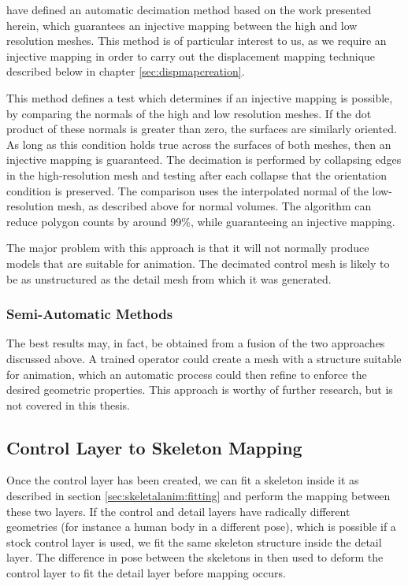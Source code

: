 \citet{Collins02} have defined an automatic decimation method based on the work presented herein, which guarantees an injective mapping between the high and low resolution meshes. This method is of particular interest to us, as we require an injective mapping in order to carry out the displacement mapping technique described below in chapter \ref{sec:dispmapcreation}.

This method defines a test which determines if an injective mapping is possible, by comparing the normals of the high and low resolution meshes. If the dot product of these normals is greater than zero, the surfaces are similarly oriented. As long as this condition holds true across the surfaces of both meshes, then an injective mapping is guaranteed. The decimation is performed by collapsing edges in the high-resolution mesh and testing after each collapse that the orientation condition is preserved. The comparison uses the interpolated normal of the low-resolution mesh, as described above for normal volumes. The algorithm can reduce polygon counts by around 99\%, while guaranteeing an injective mapping.

The major problem with this approach is that it will not normally produce models that are suitable for animation. The decimated control mesh is likely to be as unstructured as the detail mesh from which it was generated.

\subsubsection{\label{sec:scandata:creation:control:semiautomatic}Semi-Automatic Methods}

The best results may, in fact, be obtained from a fusion of the two approaches discussed above. A trained operator could create a mesh with a structure suitable for animation, which an automatic process could then refine to enforce the desired geometric properties. This approach is worthy of further research, but is not covered in this thesis.

\subsection{\label{sec:scandata:creation:skeletalmapping}Control Layer to Skeleton Mapping}

Once the control layer has been created, we can fit a skeleton inside it as described in section \ref{sec:skeletalanim:fitting} and perform the mapping between these two layers. If the control and detail layers have radically different geometries (for instance a human body in a different pose), which is possible if a stock control layer is used, we fit the same skeleton structure inside the detail layer. The difference in pose between the skeletons in then used to deform the control layer to fit the detail layer before mapping occurs.

